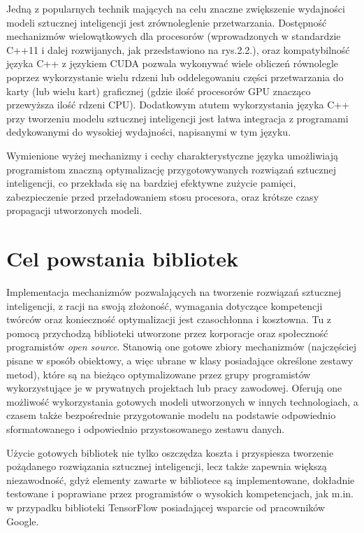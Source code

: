 Jedną z popularnych technik mających na celu znaczne zwiększenie wydajności modeli sztucznej inteligencji jest zrównoleglenie przetwarzania. Dostępność mechanizmów wielowątkowych dla procesorów (wprowadzonych w standardzie C++11 i dalej rozwijanych, jak przedstawiono na rys.2.2.), oraz kompatybilność języka C++ z językiem CUDA pozwala wykonywać wiele obliczeń równolegle poprzez wykorzystanie wielu rdzeni lub oddelegowaniu części przetwarzania do karty (lub wielu kart) graficznej (gdzie ilość procesorów GPU znacząco przewyższa ilość rdzeni CPU). Dodatkowym atutem wykorzystania języka C++ przy tworzeniu modelu sztucznej inteligencji jest łatwa integracja z programami dedykowanymi do wysokiej wydajności, napisanymi w tym języku.

Wymienione wyżej mechanizmy i cechy charakterystyczne języka umożliwiają programistom znaczną optymalizację przygotowywanych rozwiązań sztucznej inteligencji, co przekłada się na bardziej efektywne zużycie pamięci, zabezpieczenie przed przeładowaniem stosu procesora, oraz krótsze czasy propagacji utworzonych modeli.

\section{Cel powstania bibliotek}

Implementacja mechanizmów pozwalających na tworzenie rozwiązań sztucznej inteligencji, z racji na swoją złożoność, wymagania dotyczące kompetencji twórców  oraz konieczność optymalizacji jest czasochłonna i kosztowna. Tu z pomocą przychodzą biblioteki utworzone przez korporacje oraz społeczność programistów \textit{open source}. Stanowią one gotowe zbiory mechanizmów (najczęściej pisane w sposób obiektowy, a więc ubrane w klasy posiadające określone zestawy metod), które są na bieżąco optymalizowane przez grupy programistów wykorzystujące je w prywatnych projektach lub pracy zawodowej. Oferują one możliwość wykorzystania gotowych modeli utworzonych w innych technologiach, a czasem także bezpośrednie przygotowanie modelu na podstawie odpowiednio sformatowanego i odpowiednio przystosowanego zestawu danych.

Użycie gotowych bibliotek nie tylko oszczędza koszta i przyspiesza tworzenie pożądanego rozwiązania sztucznej inteligencji, lecz także zapewnia większą niezawodność, gdyż elementy zawarte w bibliotece są implementowane, dokładnie testowane i poprawiane przez programistów o wysokich kompetencjach, jak m.in. w przypadku biblioteki TensorFlow posiadającej wsparcie od pracowników Google.

